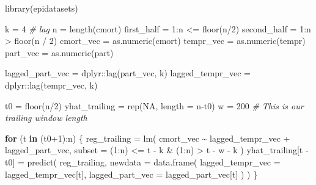 \documentclass[
]{article}
\newenvironment{Shaded}{\begin{snugshade}}{\end{snugshade}}
\newcommand{\AttributeTok}[1]{\textcolor[rgb]{0.77,0.63,0.00}{#1}}
\newcommand{\CommentTok}[1]{\textcolor[rgb]{0.56,0.35,0.01}{\textit{#1}}}
\newcommand{\ConstantTok}[1]{\textcolor[rgb]{0.00,0.00,0.00}{#1}}
\newcommand{\ControlFlowTok}[1]{\textcolor[rgb]{0.13,0.29,0.53}{\textbf{#1}}}
\newcommand{\DecValTok}[1]{\textcolor[rgb]{0.00,0.00,0.81}{#1}}
\newcommand{\FunctionTok}[1]{\textcolor[rgb]{0.00,0.00,0.00}{#1}}
\newcommand{\NormalTok}[1]{#1}
\newcommand{\OtherTok}[1]{\textcolor[rgb]{0.56,0.35,0.01}{#1}}
\newcommand{\SpecialCharTok}[1]{\textcolor[rgb]{0.00,0.00,0.00}{#1}}
\begin{document}
\begin{Shaded}
\begin{Highlighting}[]
\FunctionTok{library}\NormalTok{(epidatasets)}

\NormalTok{k }\OtherTok{=} \DecValTok{4} \CommentTok{\# lag}
\NormalTok{n }\OtherTok{=} \FunctionTok{length}\NormalTok{(cmort)}
\NormalTok{first\_half }\OtherTok{=} \DecValTok{1}\SpecialCharTok{:}\NormalTok{n }\SpecialCharTok{\textless{}=} \FunctionTok{floor}\NormalTok{(n}\SpecialCharTok{/}\DecValTok{2}\NormalTok{)}
\NormalTok{second\_half }\OtherTok{=} \DecValTok{1}\SpecialCharTok{:}\NormalTok{n }\SpecialCharTok{\textgreater{}} \FunctionTok{floor}\NormalTok{(n }\SpecialCharTok{/} \DecValTok{2}\NormalTok{)}
\NormalTok{cmort\_vec }\OtherTok{=} \FunctionTok{as.numeric}\NormalTok{(cmort)}
\NormalTok{tempr\_vec }\OtherTok{=} \FunctionTok{as.numeric}\NormalTok{(tempr)}
\NormalTok{part\_vec }\OtherTok{=} \FunctionTok{as.numeric}\NormalTok{(part)}

\NormalTok{lagged\_part\_vec }\OtherTok{=}\NormalTok{ dplyr}\SpecialCharTok{::}\FunctionTok{lag}\NormalTok{(part\_vec, k)}
\NormalTok{lagged\_tempr\_vec }\OtherTok{=}\NormalTok{ dplyr}\SpecialCharTok{::}\FunctionTok{lag}\NormalTok{(tempr\_vec, k)}

\NormalTok{t0 }\OtherTok{=} \FunctionTok{floor}\NormalTok{(n}\SpecialCharTok{/}\DecValTok{2}\NormalTok{)}
\NormalTok{yhat\_trailing }\OtherTok{=} \FunctionTok{rep}\NormalTok{(}\ConstantTok{NA}\NormalTok{, }\AttributeTok{length =}\NormalTok{ n}\SpecialCharTok{{-}}\NormalTok{t0)}
\NormalTok{w }\OtherTok{=} \DecValTok{200} \CommentTok{\# This is our trailing window length}

\ControlFlowTok{for}\NormalTok{ (t }\ControlFlowTok{in}\NormalTok{ (t0}\SpecialCharTok{+}\DecValTok{1}\NormalTok{)}\SpecialCharTok{:}\NormalTok{n) \{}
\NormalTok{  reg\_trailing }\OtherTok{=} \FunctionTok{lm}\NormalTok{(}
\NormalTok{    cmort\_vec }\SpecialCharTok{\textasciitilde{}}\NormalTok{ lagged\_tempr\_vec }\SpecialCharTok{+}\NormalTok{ lagged\_part\_vec,}
    \AttributeTok{subset =}\NormalTok{ (}\DecValTok{1}\SpecialCharTok{:}\NormalTok{n) }\SpecialCharTok{\textless{}=}\NormalTok{ t }\SpecialCharTok{{-}}\NormalTok{ k }\SpecialCharTok{\&}\NormalTok{ (}\DecValTok{1}\SpecialCharTok{:}\NormalTok{n) }\SpecialCharTok{\textgreater{}}\NormalTok{ t }\SpecialCharTok{{-}}\NormalTok{ w }\SpecialCharTok{{-}}\NormalTok{ k}
\NormalTok{  )}
\NormalTok{  yhat\_trailing[t }\SpecialCharTok{{-}}\NormalTok{ t0] }\OtherTok{=} \FunctionTok{predict}\NormalTok{(}
\NormalTok{    reg\_trailing,}
    \AttributeTok{newdata =} \FunctionTok{data.frame}\NormalTok{(}
      \AttributeTok{lagged\_tempr\_vec =}\NormalTok{ lagged\_tempr\_vec[t],}
      \AttributeTok{lagged\_part\_vec =}\NormalTok{ lagged\_part\_vec[t]}
\NormalTok{    )}
\NormalTok{  )}
\NormalTok{\}}


\end{Highlighting}
\end{Shaded}
\end{document}
